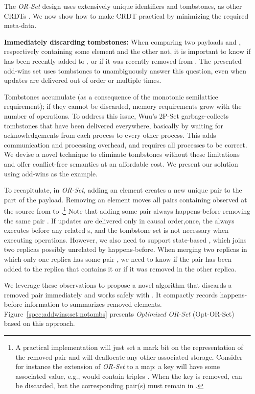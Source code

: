 \documentclass[a4paper]{article}
\begin{document}
The \emph{OR-Set} design uses extensively unique identifiers and tombstones,
as other CRDTs \cite{alg:rep:sh131,app:rep:1652,rep:syn:sh138}.  We now show
how to make CRDT practical by minimizing the required meta-data.

{\bf Immediately discarding tombstones:} When comparing two payloads  and
, respectively containing some element  and the other not, it is
important to know if  has been recently added to , or if it was
recently removed from .  The presented add-wins set uses tombstones to
unambiguously answer this question, even when updates are delivered out of
order or multiple times.

Tombstones accumulate (as a consequence of the monotonic
semilattice requirement); if they cannot be discarded, memory
requirements grow with the number of operations.
To address this issue, Wuu's 2P-Set \cite{app:rep:optim:1501}
garbage-collects tombstones that have been delivered everywhere, basically by
waiting for acknowledgements from each process to every other process.
This adds communication and processing overhead, and requires all
processes to be correct. We devise a novel technique to eliminate tombstones without these
limitations and offer conflict-free semantics at an affordable cost.
We present our solution using add-wins as the example.

To recapitulate, in \emph{OR-Set}, adding an element  creates a new unique
 pair to the  part of the payload.  Removing an element moves all
pairs containing  observed at the source from  to .\footnote{
A  practical implementation will just set a mark bit on the representation
of the removed pair and will deallocate any other associated storage.
Consider for instance the extension of \emph{OR-Set} to a map: a key will have some
associated value, e.g.,  would contain triples .
When the key is removed,  can be discarded, but the
corresponding  pair(s) must remain in .  }
Note that adding some pair  always happens-before removing the same
pair .  If updates are delivered only in causal order,once, the \add always executes before any related \remove{}s, and the
tombstone set  is not necessary when executing operations.  However, we
also need to support state-based \merge, which joins two replicas possibly
unrelated by happens-before.  When merging two replicas in which only one
replica has some pair , we need to know if the pair has been added to
the replica that contains it or if it was removed in the other replica.

We leverage these observations to propose a novel \remove algorithm that
discards a removed pair immediately and works safely with \merge.  It
compactly records happens-before information to summarizes removed
elements.  Figure~\ref{spec:addwins:set:notombs} presents \emph{Optimized OR-Set}
(Opt-OR-Set) based on this approach.
\end{document}
